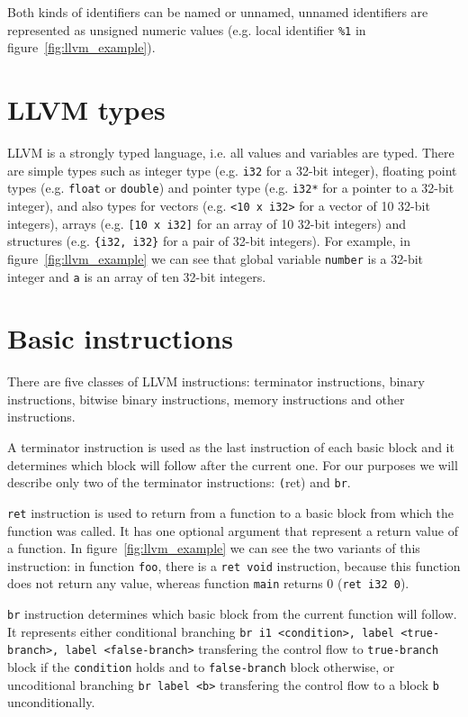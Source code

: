 Both kinds of identifiers can be named or unnamed, unnamed identifiers are
represented as unsigned numeric values (e.g. local identifier \texttt{\%1} in
figure~\ref{fig:llvm_example}).

\section{LLVM types}

LLVM is a strongly typed language, i.e. all values and variables are typed.
There are simple types such as integer type (e.g. \texttt{i32} for a 32-bit
integer), floating point types (e.g. \texttt{float} or \texttt{double}) and
pointer type (e.g. \texttt{i32*} for a pointer to a 32-bit integer), and also
types for vectors (e.g. \texttt{<10 x i32>} for a vector of 10 32-bit
integers), arrays (e.g. \texttt{[10 x i32]} for an array of 10 32-bit integers)
and structures (e.g. \texttt{\{i32, i32\}} for a pair of 32-bit integers). For
example, in figure~\ref{fig:llvm_example} we can see that global variable
\texttt{number} is a 32-bit integer and \texttt{a} is an array of ten
32-bit integers.

\section{Basic instructions}

There are five classes of LLVM instructions: terminator instructions, binary
instructions, bitwise binary instructions, memory instructions and other
instructions.

A terminator instruction is used as the last instruction of each basic block
and it determines which block will follow after the current one. For our
purposes we will describe only two of the terminator instructions: \texttt(ret)
and \texttt{br}.

\texttt{ret} instruction is used to return from a function to a basic block
from which the function was called. It has one optional argument that represent
a return value of a function. In figure~\ref{fig:llvm_example} we can see the
two variants of this instruction: in function \texttt{foo}, there is a
\texttt{ret void} instruction, because this function does not return any value,
whereas function \texttt{main} returns 0 (\texttt{ret i32 0}).

\texttt{br} instruction determines which basic block from the current function
will follow. It represents either conditional branching \texttt{br i1
<condition>, label <true-branch>, label <false-branch>} transfering the control
flow to \texttt{true-branch} block if the \texttt{condition} holds and to
\texttt{false-branch} block otherwise, or uncoditional branching \texttt{br
label <b>} transfering the control flow to a block \texttt{b} unconditionally.

